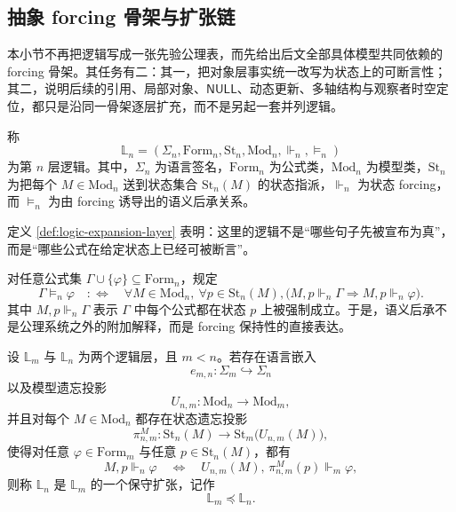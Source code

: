 \subsection{抽象 forcing 骨架与扩张链}\label{subsec:logic-expansion-chain-abstract-forcing}

本小节不再把逻辑写成一张先验公理表，而先给出后文全部具体模型共同依赖的 forcing 骨架。其任务有二：其一，把对象层事实统一改写为状态上的可断言性；其二，说明后续的引用、局部对象、\(\mathsf{NULL}\)、动态更新、多轴结构与观察者时空定位，都只是沿同一骨架逐层扩充，而不是另起一套并列逻辑。

\begin{definition}[逻辑层]\label{def:logic-expansion-layer}
称
\[
\mathbb{L}_n=(\Sigma_n,\mathrm{Form}_n,\mathrm{St}_n,\mathrm{Mod}_n,\Vdash_n,\models_n)
\]
为第 \(n\) 层逻辑。其中，\(\Sigma_n\) 为语言签名，\(\mathrm{Form}_n\) 为公式类，\(\mathrm{Mod}_n\) 为模型类，\(\mathrm{St}_n\) 为把每个 \(M\in\mathrm{Mod}_n\) 送到状态集合 \(\mathrm{St}_n(M)\) 的状态指派，\(\Vdash_n\) 为状态 forcing，而 \(\models_n\) 为由 forcing 诱导出的语义后承关系。
\end{definition}

定义 \ref{def:logic-expansion-layer} 表明：这里的逻辑不是“哪些句子先被宣布为真”，而是“哪些公式在给定状态上已经可被断言”。

对任意公式集 \(\Gamma\cup\{\varphi\}\subseteq \mathrm{Form}_n\)，规定
\[
\Gamma \models_n \varphi
\quad:\Longleftrightarrow\quad
\forall M\in\mathrm{Mod}_n,\ \forall p\in\mathrm{St}_n(M),
\bigl(M,p\Vdash_n \Gamma \Rightarrow M,p\Vdash_n \varphi\bigr).
\]
其中 \(M,p\Vdash_n \Gamma\) 表示 \(\Gamma\) 中每个公式都在状态 \(p\) 上被强制成立。于是，语义后承不是公理系统之外的附加解释，而是 forcing 保持性的直接表达。

\begin{definition}[保守扩张]\label{def:logic-expansion-conservative-extension}
设 \(\mathbb{L}_m\) 与 \(\mathbb{L}_n\) 为两个逻辑层，且 \(m<n\)。若存在语言嵌入
\[
e_{m,n}:\Sigma_m\hookrightarrow \Sigma_n
\]
以及模型遗忘投影
\[
U_{n,m}:\mathrm{Mod}_n\to \mathrm{Mod}_m,
\]
并且对每个 \(M\in\mathrm{Mod}_n\) 都存在状态遗忘投影
\[
\pi_{n,m}^M:\mathrm{St}_n(M)\to \mathrm{St}_m\bigl(U_{n,m}(M)\bigr),
\]
使得对任意 \(\varphi\in \mathrm{Form}_m\) 与任意 \(p\in \mathrm{St}_n(M)\)，都有
\[
M,p\Vdash_n \varphi
\quad\Longleftrightarrow\quad
U_{n,m}(M),\,\pi_{n,m}^M(p)\Vdash_m \varphi,
\]
则称 \(\mathbb{L}_n\) 是 \(\mathbb{L}_m\) 的一个保守扩张，记作
\[
\mathbb{L}_m\preceq \mathbb{L}_n.
\]
\end{definition}

